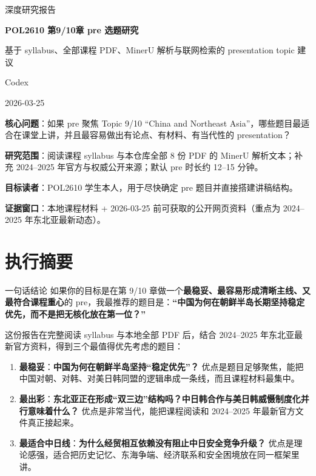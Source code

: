 \documentclass[a4paper]{article}
\newcommand{\reporttitle}{POL2610 第9/10章 pre 选题研究}
\newcommand{\reportsubtitle}{基于 syllabus、全部课程 PDF、MinerU 解析与联网检索的 presentation topic 建议}
\newcommand{\reportauthors}{Codex}
\newcommand{\reportdate}{2026-03-25}
\newcommand{\researchquestion}{如果 pre 聚焦 Topic 9/10 ``China and Northeast Asia''，哪些题目最适合在课堂上讲，并且最容易做出有论点、有材料、有当代性的 presentation？}
\newcommand{\reportscope}{阅读课程 syllabus 与本仓库全部 8 份 PDF 的 MinerU 解析文本；补充 2024--2025 年官方与权威公开来源；默认 pre 时长约 12--15 分钟。}
\newcommand{\reportaudience}{POL2610 学生本人，用于尽快确定 pre 题目并直接搭建讲稿结构。}
\newcommand{\sourcewindow}{本地课程材料 + 2026-03-25 前可获取的公开网页资料（重点为 2024--2025 年东北亚最新动态）。}
\begin{document}
\begin{titlepage}
\centering
{\Large 深度研究报告\par}
\vspace{1.0cm}
{\huge\bfseries \reporttitle\par}
\vspace{0.5cm}
{\Large \reportsubtitle\par}
\vspace{0.9cm}
{\large \reportauthors\par}
\vspace{0.2cm}
{\large \reportdate\par}
\vspace{1.0cm}

\begin{tcolorbox}[width=0.94\textwidth, colback=black!2!white, colframe=black!60, sharp corners]
\textbf{核心问题}：\researchquestion\par
\textbf{研究范围}：\reportscope\par
\textbf{目标读者}：\reportaudience\par
\textbf{证据窗口}：\sourcewindow\par
\end{tcolorbox}
\end{titlepage}

\tableofcontents
\newpage

\section{执行摘要}

\begin{findingbox}{一句话结论}
如果你的目标是在第 9/10 章做一个\textbf{最稳妥、最容易形成清晰主线、又最符合课程重心}的 pre，我最推荐的题目是：\textbf{``中国为何在朝鲜半岛长期坚持稳定优先，而不是把无核化放在第一位？''}
\end{findingbox}

这份报告在完整阅读 syllabus 与本地全部 PDF 后，结合 2024--2025 年东北亚最新官方资料，得到三个最值得优先考虑的题目：

\begin{enumerate}
\item \textbf{最稳妥}：\textbf{中国为何在朝鲜半岛坚持``稳定优先''？}  
优点是题目足够聚焦，能把中国对朝、对韩、对美日韩同盟的逻辑串成一条线，而且课程材料最集中。
\item \textbf{最出彩}：\textbf{东北亚正在形成``双三边''结构吗？中日韩合作与美日韩威慑制度化并行意味着什么？}  
优点是非常当代，能把课程阅读和 2024--2025 年最新官方文件真正接起来。
\item \textbf{最适合中日线}：\textbf{为什么经贸相互依赖没有阻止中日安全竞争升级？}  
优点是理论感强，适合把历史记忆、东海争端、经济联系和安全困境放在同一框架里讲。
\end{enumerate}
\end{document}
